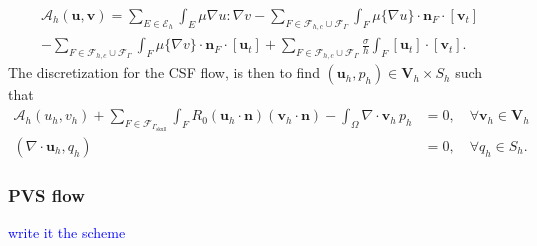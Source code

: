 \documentclass[fleqn,10pt]{wlscirep}
\newcommand{\rami}[1]{\textcolor{blue}{#1}}
\begin{document}
\begin{multline}
\mathcal{A}_h (\bm u, \bm v) = \sum_{E \in \mathcal{E}_h} \int_{E} \mu \nabla u : \nabla v - \sum_{
F \in \mathcal{F}_{h,c} \cup \mathcal{F}_{\Gamma} 
} \int_{F} \mu \{\nabla u\}\cdot \bm n_F \cdot [\bm v_t] 
\\ - \sum_{
F \in \mathcal{F}_{h,c} \cup \mathcal{F}_{\Gamma} 
} \int_{F} \mu \{\nabla v\}\cdot \bm n_F \cdot [\bm u_t]
+ \sum_{
F \in \mathcal{F}_{h,c} \cup \mathcal{F}_{\Gamma} 
} \frac{\sigma}{h} \int_{F} [\bm u_t ] \cdot [\bm v_t].   
\end{multline}
The discretization for the CSF flow, is then to find $(\bm u_h, p_h) \in \bm V_h \times S_h$ such  that 
\begin{align}
\mathcal{A}_h(u_h, v_h)  + \sum_{F \in \mathcal{F}_{\Gamma_{\mathrm{skull}}}} \int_{F} R_0 (\bm u_h \cdot \bm n) (\bm v_h \cdot \bm n) - \int_{\Omega} \nabla \cdot \bm v_h \, p_h  & = 0, \quad \forall \bm v_h \in \bm V_h   \\ 
(\nabla \cdot \bm u_h , q_h ) & = 0, \quad \forall q_h \in S_h.
\end{align}
\subsubsection{PVS flow} 
\rami{write it the scheme}
\end{document}
